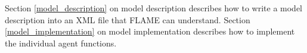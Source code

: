 Section \ref{model_description} on model description describes how to write a
model description into an XML file that FLAME can understand. Section
\ref{model_implementation} on model implementation describes how to implement
the individual agent functions. 

% 
% 
% 
% 
